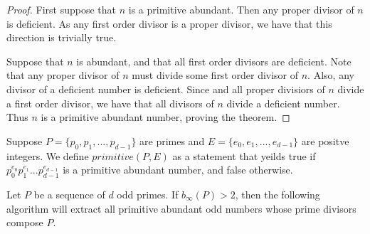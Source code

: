 \documentclass[../paper.tex]{subfiles}
\begin{document}
\begin{proof}
	First suppose that $n$ is a primitive abundant. Then any proper 
divisor of $n$ is deficient. As any first order divisor is a
proper divisor, we have that this direction is trivially true.

	Suppose that $n$ is abundant, and that all first order divisors
are deficient. Note that any proper divisor of $n$ must divide
some first order divisor of $n$. Also, any divisor of a deficient 
number is deficient. Since and all proper divisiors of $n$ divide 
a first order divisor, we have that all divisors of $n$ divide a
deficient number. Thus $n$ is a primitive abundant number, proving
the theorem.  
\end{proof}

Suppose $P = \{p_0, p_1, ...,p_{d-1}\}$ are primes and 
$E = \{e_0, e_1, ..., e_{d-1} \}$ are positve integers.
We define $primitive(P,E)$ as a statement that yeilds true
if $p_0^{e_0} p_1^{e_1} ... p_{d-1}^{e_{d-1}}$ is a primitive
abundant number, and false otherwise.

\begin{theorem} 
Let $P$ be a sequence of $d$ odd primes. If $b_{\infty}(P) > 2$, then the 
following algorithm will extract all primitive
abundant odd numbers whose prime divisors compose $P$.
\end{theorem}
%
%
%
%
%
\end{document}
